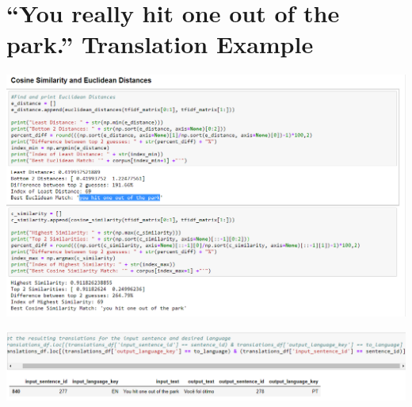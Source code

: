 \documentclass[runningheads]{llncs}
\begin{document}
\section{``You really hit one out of the park.'' Translation Example}
\hypertarget{Appendix G}{}
	\begin{minipage}{\linewidth}
		\begin{center}
			\includegraphics[width=\linewidth]{Park_Comparison.png}
			\label{fig:Sentence Comparison 4}
			\vspace*{1cm}
		\end{center}
	\end{minipage}
	\afterpage{\clearpage}
	\begin{minipage}{\linewidth}
		\begin{center}
			\includegraphics[width=\linewidth]{Park_Translation.png}
			\label{fig:Translation for Colloquialism}
			\vspace*{1cm}
		\end{center}
	\end{minipage}
	\afterpage{\clearpage}
\end{document}
